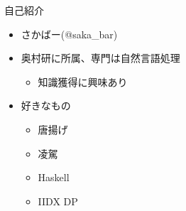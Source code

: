 \begin{frame}{自己紹介}
\begin{itemize}
 \item さかばー(@saka\_bar)
 \item 奥村研に所属、専門は自然言語処理
       \begin{itemize}
	\item 知識獲得に興味あり
       \end{itemize}
 \item 好きなもの
       \begin{itemize}
	\item 唐揚げ
	\item 凌駕
	\item Haskell
	\item IIDX DP
       \end{itemize}

			 \end{itemize}
\end{frame}
